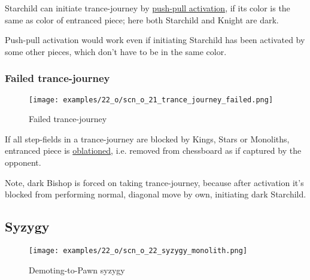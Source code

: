Starchild can initiate trance-journey by
\hyperref[sec:Terms/Push-pull activation]{push-pull activation},
if its color is the same as color of entranced piece; here both Starchild and Knight are dark.

Push-pull activation would work even if initiating Starchild has been activated by some other pieces,
which don't have to be in the same color.

\clearpage %

\subsubsection*{Failed trance-journey}

\vspace*{-1.1\baselineskip}
\noindent
\begin{figure}[!h]
\texttt{[image: examples/22\_o/scn\_o\_21\_trance\_journey\_failed.png]}
\caption{Failed trance-journey}
\label{fig:scn_o_21_trance_journey_failed}
\end{figure}

If all step-fields in a trance-journey are blocked by Kings, Stars or Monoliths, entranced piece is
\hyperref[sec:Terms/Oblation]{oblationed}, i.e. removed from chessboard as if captured by the opponent.

Note, dark Bishop is forced on taking trance-journey, because after activation it's blocked from performing
normal, diagonal move by own, initiating dark Starchild.

\clearpage %

\subsection*{Syzygy}

\vspace*{-1.3\baselineskip}
\noindent
\begin{figure}[!h]
\texttt{[image: examples/22\_o/scn\_o\_22\_syzygy\_monolith.png]}
\caption{Demoting-to-Pawn syzygy}
\label{fig:scn_o_22_syzygy_monolith}
\end{figure}

